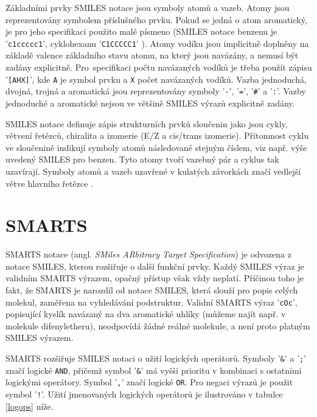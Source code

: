Základními prvky SMILES notace jsou symboly atomů a vazeb. Atomy jsou reprezentovány symbolem příslušného prvku. Pokud se jedná o atom aromatický, je pro jeho specifikaci použito malé písmeno (SMILES notace benzenu je '\verb|c1ccccc1|', cyklohexanu '\verb|C1CCCCC1|'
). Atomy vodíku jsou implicitně doplněny na základě valence základního stavu atomu, na který jsou navázány, a nemusí být  zadány explicitně. Pro~specifikaci počtu navázaných vodíků je třeba použít zápisu '\verb|[AHX]|', kde \verb|A| je symbol prvku a \verb|X| počet navázaných vodíků. Vazba jednoduchá, dvojná, trojná a aromatická jsou reprezentovány symboly '\verb|-|', '\verb|=|', '\verb|#|' a '\verb|:|'. Vazby jednoduché a aromatické nejsou ve většině SMILES výrazů explicitně zadány.

SMILES notace definuje zápis strukturních prvků sloučenin jako jsou cykly, větvení řetězců, chiralita a izomerie (E/Z a cis/trans izomerie). Přítomnost cyklu ve sloučenině indikují symboly atomů následované stejným číslem, viz např. výše uvedený SMILES pro benzen. Tyto atomy tvoří vazebný pár a cyklus tak uzavírají. Symboly atomů a vazeb uzavřené v kulatých závorkách značí vedlejší větve hlavního řetězce \cite{SMILES_exm}. 

\section{SMARTS}
\label{SMARTS}
SMARTS notace \cite{SMARTS_intro, SMARTS_exm} (angl. \textit{SMiles ARbitrary Target Specification}) je odvozena z notace SMILES, kterou rozšiřuje o další funkční prvky. Každý SMILES výraz je validním SMARTS výrazem, opačný přístup však vždy neplatí. Příčinou toho je fakt, že SMARTS je narozdíl od  notace SMILES, která slouží pro popis celých molekul, zaměřena na vyhledávání podstruktur. Validní SMARTS výraz '\verb|cOc|', popisující kyslík navázaný na dva aromatické uhlíky (můžeme najít např. v molekule difenyletheru), neodpovídá žádné reálné molekule, a není proto platným SMILES výrazem. 

SMARTS rozšiřuje SMILES notaci o užití logických operátorů. Symboly '\verb|&|' a '\verb|;|' značí logické \verb|AND|, přičemž symbol '\verb|&|' má vyšší prioritu v kombinaci s ostatními logickými operátory. Symbol '\verb|,|' značí logické \verb|OR|. Pro negaci výrazů je použit symbol '\verb|!|'. Užití jmenovaných logických operátorů je ilustrováno v tabulce \ref{logops} níže.

